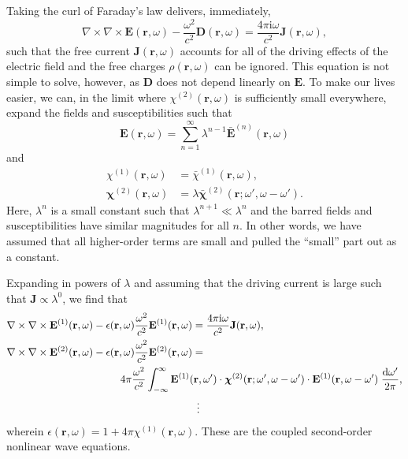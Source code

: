 \documentclass{article}
\begin{document}
Taking the curl of Faraday's law delivers, immediately,
\begin{equation}
\nabla\times\nabla\times\mathbf{E}(\mathbf{r},\omega) - \frac{\omega^2}{c^2}\mathbf{D}(\mathbf{r},\omega) = \frac{4\pi\mathrm{i}\omega}{c^2}\mathbf{J}(\mathbf{r},\omega),
\end{equation}
such that the free current $\mathbf{J}(\mathbf{r},\omega)$ accounts for all of the driving effects of the electric field and the free charges $\rho(\mathbf{r},\omega)$ can be ignored. This equation is not simple to solve, however, as $\mathbf{D}$ does not depend linearly on $\mathbf{E}$. To make our lives easier, we can, in the limit where $\chi^{(2)}(\mathbf{r},\omega)$ is sufficiently small everywhere, expand the fields and susceptibilities such that
\begin{equation}
\mathbf{E}(\mathbf{r},\omega) = \sum_{n= 1}^\infty\lambda^{n - 1}\bar{\mathbf{E}}^{(n)}(\mathbf{r},\omega)
\end{equation}
and
\begin{equation}
\begin{split}
\chi^{(1)}(\mathbf{r},\omega) &= \bar{\chi}^{(1)}(\mathbf{r},\omega),\\
\bm{\chi}^{(2)}(\mathbf{r},\omega) &= \lambda\bar{\bm{\chi}}^{(2)}(\mathbf{r};\omega',\omega - \omega').
\end{split}
\end{equation}
Here, $\lambda^n$ is a small constant such that $\lambda^{n+1}\ll\lambda^n$ and the barred fields and susceptibilities have similar magnitudes for all $n$. In other words, we have assumed that all higher-order terms are small and pulled the ``small'' part out as a constant.

Expanding in powers of $\lambda$ and assuming that the driving current is large such that $\mathbf{J}\propto\lambda^0$, we find that
\begin{equation}\label{eq:nonLinWaveEq1}
\begin{split}
\nabla\times\nabla\times\mathbf{E}^{(1)}(\mathbf{r},\omega) - \epsilon(\mathbf{r},\omega)\frac{\omega^2}{c^2}\mathbf{E}^{(1)}(\mathbf{r},\omega) &= \frac{4\pi\mathrm{i}\omega}{c^2}\mathbf{J}(\mathbf{r},\omega),\\
\nabla\times\nabla\times\mathbf{E}^{(2)}(\mathbf{r},\omega) - \epsilon(\mathbf{r},\omega)\frac{\omega^2}{c^2}\mathbf{E}^{(2)}(\mathbf{r},\omega) &= \\
&\hspace{-0.2\textwidth}4\pi\frac{\omega^2}{c^2}\int_{-\infty}^\infty\mathbf{E}^{(1)}(\mathbf{r},\omega')\cdot\bm{\chi}^{(2)}(\mathbf{r};\omega',\omega - \omega')\cdot\mathbf{E}^{(1)}(\mathbf{r},\omega - \omega')\;\frac{\mathrm{d}\omega'}{2\pi},\\
&\hspace{0.0125\textwidth}\vdots
\end{split}
\end{equation}
wherein $\epsilon(\mathbf{r},\omega) = 1 + 4\pi\chi^{(1)}(\mathbf{r},\omega)$. These are the coupled second-order nonlinear wave equations.
\end{document}
